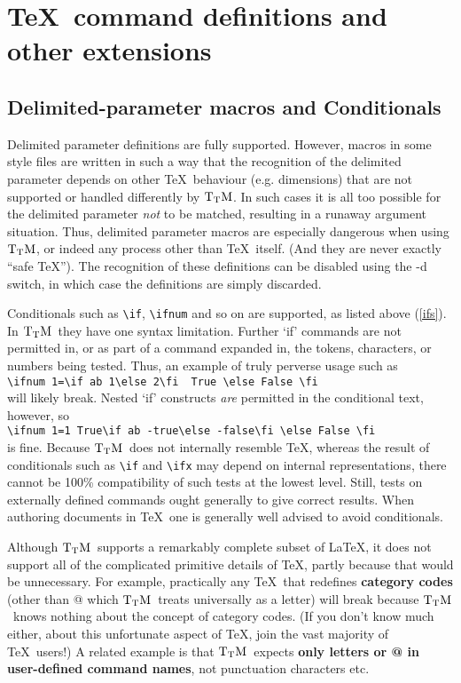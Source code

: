 \documentclass[12pt]{article}
\def\TtM{$\rm{}T_TH$}
\def\TtM{$\rm{}T_TM$}%
\begin{document}
\section{\TeX\ command definitions and other extensions}

\subsection{Delimited-parameter macros and
Conditionals}

Delimited parameter definitions are fully supported. However, macros
in some style files are written in such a way that the recognition of
the delimited parameter depends on other \TeX\ behaviour
(e.g. dimensions) that are not supported or handled differently by
\TtM. In such cases it is all too possible for the delimited parameter
\emph{not} to be matched, resulting in a runaway argument situation.
Thus, delimited parameter macros are especially dangerous when using
\TtM, or indeed any process other than \TeX\ itself. (And they are
never exactly ``safe \TeX''). The recognition of these definitions can
be disabled using the -d switch, in which case the definitions are
simply discarded.

Conditionals such as \verb|\if|, \verb|\ifnum| and so on are
supported, as listed above (\ref{ifs}). In \TtM\ they have one
syntax limitation. Further `if' commands are not permitted in, or as part of
a command expanded in, the tokens, characters, or numbers being
tested. Thus, an example of truly perverse usage such as\\
\verb|\ifnum 1=\if ab 1\else 2\fi  True \else False \fi|\\ will likely
break. Nested `if' constructs \emph{are} permitted in the conditional
text, however, so\\ 
\verb|\ifnum 1=1 True\if ab -true\else -false\fi \else False \fi|\\ is fine.
Because \TtM\ does not internally resemble \TeX, whereas the result of
conditionals such as \verb|\if| and \verb|\ifx| may depend on internal
representations, there cannot be 100\% compatibility of such tests at
the lowest level. Still, tests on externally defined commands ought
generally to give correct results. When authoring documents in \TeX\ one
is generally well advised to avoid conditionals.


Although \TtM\ supports a remarkably complete subset of \LaTeX, it does
not support all of the complicated primitive details of
\TeX, partly because that would be unnecessary. 
For example, practically any \TeX\ that redefines {\bf category codes}
(other than @ which \TtM\ treats universally as a letter) will break because
\TtM\ knows nothing about the concept of category codes. (If you don't
know much either, about this unfortunate aspect of \TeX, join the vast
majority of \TeX\ users!)  A related example is that \TtM\ expects {\bf
only letters or @ in user-defined command names}, not punctuation
characters etc.
\end{document}
